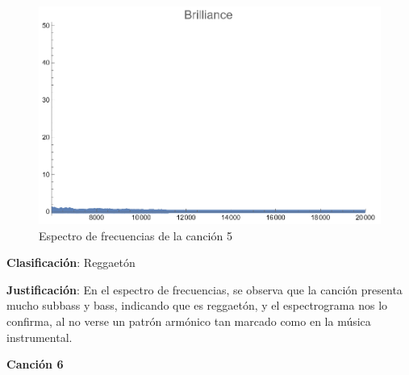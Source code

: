 \documentclass[12pt, letterpaper]{article}
\begin{document}
\begin{figure}[H]
\begin{minipage}{.3\textwidth}
  \end{minipage}
  \begin{minipage}{0.03\textwidth}\end{minipage}
  \begin{minipage}{.3\textwidth}
    \centering
    \includegraphics[width=.9\linewidth]{imgs/Cancion5/brilliance.png}
  \end{minipage}
  \caption{Espectro de frecuencias de la canción 5}
  \label{fig:esp05}
\end{figure}

\textbf{Clasificación}: Reggaetón

\textbf{Justificación}: En el espectro de frecuencias, se observa
que la canción presenta mucho subbass y bass, indicando que es reggaetón,
y el espectrograma nos lo confirma, al no verse un patrón armónico
tan marcado como en la música instrumental.

\newpage

\textbf{\large{Canción 6}}
\end{document}
